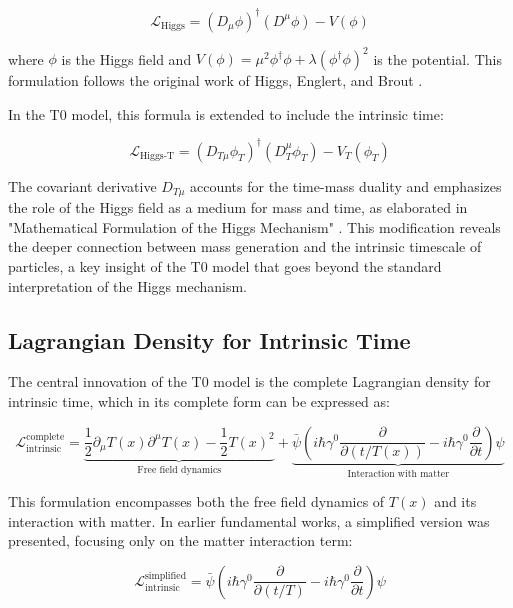 \documentclass[a4paper,12pt]{article}
\newcommand{\Tfield}{T(x)}
\begin{document}
	\begin{equation}
		\mathcal{L}_\text{Higgs} = (D_\mu \phi)^\dagger (D^\mu \phi) - V(\phi)
	\end{equation}
	
	where $\phi$ is the Higgs field and $V(\phi) = \mu^2 \phi^\dagger \phi + \lambda (\phi^\dagger \phi)^2$ is the potential. This formulation follows the original work of Higgs, Englert, and Brout \cite{higgs1964broken, englert1964broken}.
	
	In the T0 model, this formula is extended to include the intrinsic time:
	
	\begin{equation}
		\mathcal{L}_\text{Higgs-T} = (D_{T\mu} \phi_T)^\dagger (D_T^\mu \phi_T) - V_T(\phi_T)
	\end{equation}
	
	The covariant derivative $D_{T\mu}$ accounts for the time-mass duality and emphasizes the role of the Higgs field as a medium for mass and time, as elaborated in "Mathematical Formulation of the Higgs Mechanism" \cite{pascher_higgs_2025}. This modification reveals the deeper connection between mass generation and the intrinsic timescale of particles, a key insight of the T0 model that goes beyond the standard interpretation of the Higgs mechanism.
	
	\subsection{Lagrangian Density for Intrinsic Time}
	
	The central innovation of the T0 model is the complete Lagrangian density for intrinsic time, which in its complete form can be expressed as:
	
	\begin{equation}
		\mathcal{L}_{\text{intrinsic}}^{\text{complete}} = \underbrace{\frac{1}{2} \partial_\mu \Tfield \partial^\mu \Tfield - \frac{1}{2}\Tfield^2}_{\text{Free field dynamics}} + \underbrace{\bar{\psi} \left( i\hbar \gamma^0 \frac{\partial}{\partial (t/\Tfield)} - i\hbar \gamma^0 \frac{\partial}{\partial t} \right) \psi}_{\text{Interaction with matter}}
	\end{equation}
	
	This formulation encompasses both the free field dynamics of $\Tfield$ and its interaction with matter. In earlier fundamental works, a simplified version was presented, focusing only on the matter interaction term:
	
	\begin{equation}
		\mathcal{L}_\text{intrinsic}^{\text{simplified}} = \bar{\psi} \left( i\hbar \gamma^0 \frac{\partial}{\partial (t/T)} - i\hbar \gamma^0 \frac{\partial}{\partial t} \right) \psi
	\end{equation}
	
\end{document}
